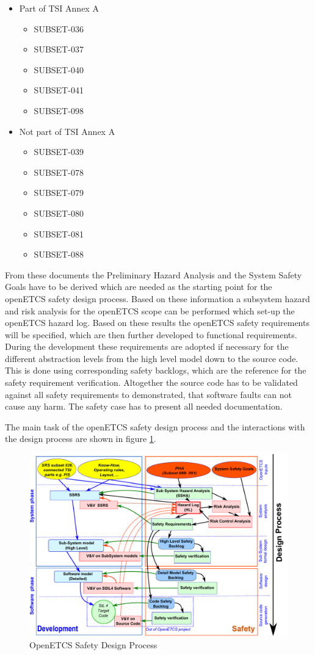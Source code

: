 \documentclass{template/openetcs_report}
\begin{document}
\begin{itemize}
\item Part of TSI Annex A
	\begin{itemize}
	\item SUBSET-036
	\item SUBSET-037
	\item SUBSET-040
	\item SUBSET-041
	\item SUBSET-098
	\end{itemize}
	
\item Not part of TSI Annex A
	\begin{itemize}
	\item SUBSET-039
	\item SUBSET-078
	\item SUBSET-079
	\item SUBSET-080
	\item SUBSET-081
	\item SUBSET-088
	\end{itemize}
\end{itemize}

From these documents the Preliminary Hazard Analysis and the System Safety Goals have to be derived which are needed as the starting point for the openETCS safety design process. Based on these information a subsystem hazard and risk analysis for the openETCS scope can be performed which set-up the openETCS hazard log. Based on these results the openETCS safety requirements will be specified, which are then further developed to functional requirements. During the development these requirements are adopted if necessary for the different abstraction levels from the high level model down to the source code. This is done using corresponding safety backlogs, which are the reference for the safety requirement verification. Altogether the source code has to be validated against all safety requirements to demonstrated, that software faults can not cause any harm. The safety case has to present all needed documentation.
 
The main task of the openETCS safety design process and the interactions with the design process are shown in figure \ref{fig:WholeSafetyProcess}.

\begin{figure}[htbp]
\centering
\includegraphics[width=0.8\linewidth]{WholeSafetyProcess}
\caption{OpenETCS Safety Design Process}
\label{fig:WholeSafetyProcess}
\end{figure}
\end{document}
